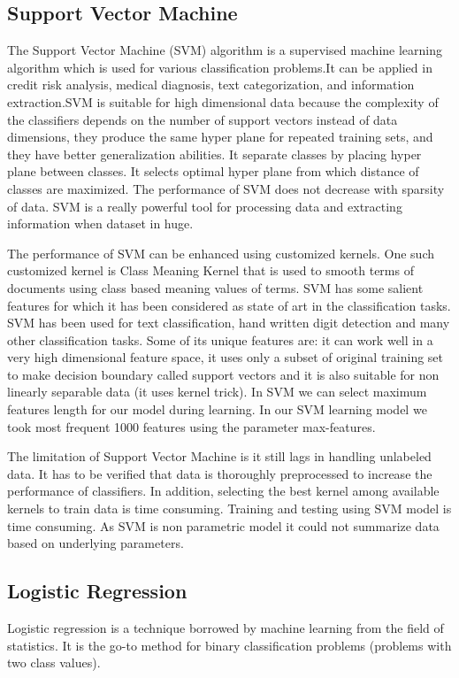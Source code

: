 \documentclass[12pt,a4paper]{report}
\begin{document}
\subsection{Support Vector Machine}
The Support Vector Machine (SVM) algorithm is a supervised machine learning algorithm which is used for various classification problems.It can be applied in credit risk analysis, medical diagnosis, text categorization, and information extraction.SVM is suitable for high dimensional data because the complexity of the classifiers depends on the number
of support vectors instead of data dimensions, they produce the same hyper plane for repeated training sets, and they have better generalization abilities. It separate classes by placing hyper plane between classes. It selects optimal hyper plane from which distance of classes are maximized. The performance of SVM does not decrease with sparsity of data. SVM is a really powerful tool for processing data and extracting information when dataset in huge.
\par 
\vspace{0.5cm}
The performance of SVM can be enhanced using customized kernels. One such customized kernel is Class Meaning Kernel that is used to smooth terms of documents using class based meaning values of terms. SVM has some salient features for which it has been considered as state of art in the classification tasks. SVM has been used for text classification, hand written digit detection and many other classification tasks. Some of its unique features are: it can work well in a very high dimensional feature space, it uses only a subset of original training set to make decision boundary called support vectors and it is also suitable for non linearly separable data (it uses kernel trick). In SVM we can select maximum features length for our model during learning. In our SVM learning model we took most frequent 1000 features using the parameter max-features.  
\par 
\vspace{0.5cm}
The limitation of Support Vector Machine is it still lags in handling unlabeled data. It has to be verified that data is thoroughly preprocessed to increase the performance of classifiers. In addition, selecting the best kernel among available kernels to train data is time consuming. Training and testing using SVM model is time consuming. As SVM is non parametric model it could not summarize data based on underlying parameters. 
\clearpage

\subsection{Logistic Regression}
Logistic regression is a technique borrowed by machine learning from the field of statistics. It is the go-to method for binary classification problems (problems with two class values).
\end{document}
